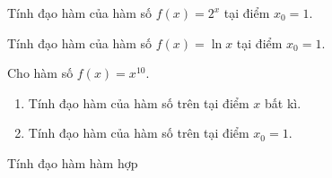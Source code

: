 \begin{bt}%
	Tính đạo hàm của hàm số $f(x)=2^x$ tại điểm $x_0=1$.
\end{bt}
\begin{bt}%
	Tính đạo hàm của hàm số $f(x)=\ln x$ tại điểm $x_0=1$.
\end{bt}
\begin{bt}%
	Cho hàm số $f(x)=x^{10}$.
	\begin{enumerate}
	\item Tính đạo hàm của hàm số trên tại điểm $x$ bất kì.
	\item Tính đạo hàm của hàm số trên tại điểm $x_0=1$.	
	\end{enumerate}
\end{bt}
\begin{dang}{Tính đạo hàm hàm hợp}
\end{dang}
